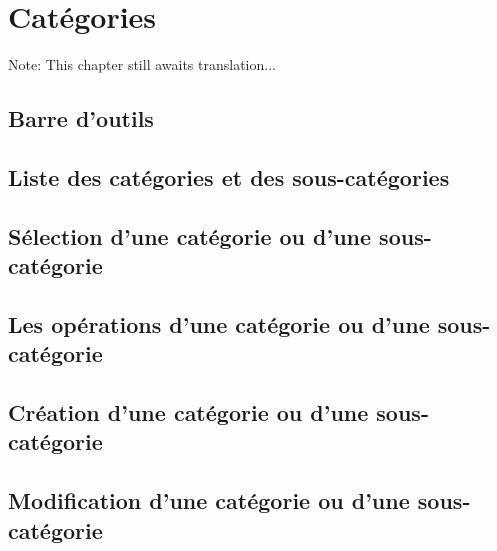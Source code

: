 
\chapter{Catégories\label{categories}}

Note: This chapter still awaits translation...

\section{Barre d'outils\label{categories-functions}}


\section{Liste des catégories et des sous-catégories\label{categories-list}}


\section{Sélection d'une catégorie ou d'une sous-catégorie\label{categories-selection}}


\section{Les opérations d'une catégorie ou d'une sous-catégorie\label{categories-transactions}}


\section{Création d'une catégorie ou d'une sous-catégorie\label{categories-new}}


\section{Modification d'une catégorie ou d'une sous-catégorie\label{categories-modify}}


